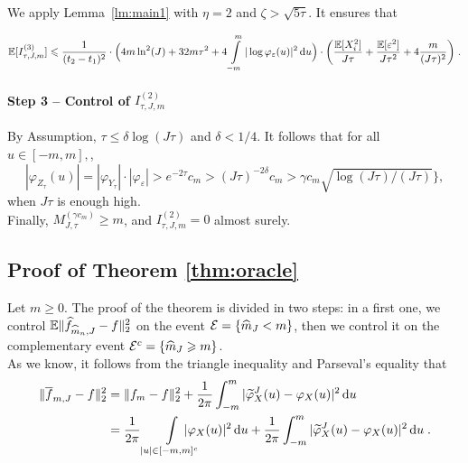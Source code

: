 We apply Lemma~\ref{lm:main1} with $\eta = 2$ and $\zeta > \sqrt{5 \tau}$. It ensures that

    \begin{equation*}
        \mathbb{E}[I_{\tau, J, m}^{(3)}] 
        \leqslant 
        \frac{1}{(t_2 - t_1)^2} \cdot \Big( 
	 4 m \ln^2(J)
	 + 
	 32 m \tau^2
	 +
	 4 \int\limits_{-m}^m | \log\varphi_\varepsilon (u)|^2 \, \mathrm du \Big)
	 \cdot 
      \bigg( \frac{\mathbb{E}[X_i^2]}{J \tau} 
			+ \frac{\mathbb{E}[\varepsilon^2]}{J \tau^2} + 4 \frac{m}{(J \tau)^2} \bigg)
   \; .
	\end{equation*}
	
	
	
\paragraph{\textbf{Step 3} -- Control of $I_{\tau, J, m}^{(2)}$}
By Assumption, $\tau \leq \delta \log(J \tau)$ and $\delta < 1/4$.
It follows that for all $u \in [-m, m], $,
    \begin{equation*}
     |\varphi_{Z_{\tau}}(u)| = |\varphi_{Y_{\tau}} |\cdot |\varphi_\varepsilon| > e^{-2\tau} c_m
	 >
  (J \tau)^{-2\delta} c_m
  >
	 \gamma c_m \sqrt{\log(J\tau)/(J\tau)} \Big\},
 	\end{equation*}
when $J\tau$ is enough high.\\
	
Finally, $M_{J, \tau}^{(\gamma c_m)} \geq m$, and $I_{\tau, J, m}^{(2)} = 0 $ almost surely. 

\subsection{Proof of Theorem \ref{thm:oracle}}

Let $m \geq 0$. The proof of the theorem is divided in two steps: 
in a first one, we control $\mathbb{E} \lVert \widehat f_{\widehat m_n, J} - f\rVert_2^2 $ on the event $\mathcal{E} = \{ \widehat m_J < m \}$, then we control it on the complementary event $\mathcal{E}^c = \{ \widehat m_J \geqslant m \}$. \\

As we know, it follows from the triangle inequality and Parseval's equality that 
    \begin{align*}
        \norm{\bar f_{m, J} - f}^2
        &= \norm{f_m - f}^2 + \frac{1}{2\pi} \int_{-m}^m | \tilde \varphi_X^J (u) - \varphi_X(u)|^2 \du \\
        &= \frac{1}{2\pi}  \int\limits_{|u| \in [-m, m]^c} \hspace{-15pt} |\varphi_X(u)|^2 \du  + \frac{1}{2\pi} \int_{-m}^m | \tilde \varphi_X^J (u) - \varphi_X(u)|^2 \du  
        \eqfinp
    \end{align*}

